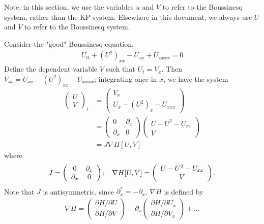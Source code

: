 \documentclass[12pt]{article}
\newcommand{\pd}[0]{\partial}
\numberwithin{equation}{section}
\begin{document}
Note: in this section, we use the variables $u$ and $V$ to refer to the Boussinesq system, rather than the KP system. Elsewhere in this document, we always use $U$ and $V$ to refer to the Boussinesq system.

Consider the "good" Boussinesq equation,
\begin{align}
    U_{tt} + \left(U^2\right)_{xx} - U_{xx} + U_{xxxx}= 0 \label{good boussinesq}
\end{align}
Define the dependent variable $V$ such that $U_t = V_x$. Then $V_{xt} = U_{xx}-\left(U^2\right)_{xx} - U_{xxxx}$; integrating once in $x$, we have the system
\begin{align}
    \left(\begin{array}{c}
         U  \\
         V 
    \end{array}\right)_t 
    &= 
    \left(\begin{array}{c}
         V_x  \\
         U_x - \left(U^2\right)_{x} - U_{xxx} 
    \end{array}\right)\nonumber \\
    &= 
    \left(\begin{array}{cc}
        0 & \pd_x \\
        \pd_x & 0
    \end{array}\right)
    \left(\begin{array}{c}
         U - U^2 - U_{xx}  \\
          V
    \end{array}\right) \nonumber\\
    &= J\nabla H[U,V] \label{JgradH}
\end{align}
where
\begin{align}
    J = \left(\begin{array}{cc}
        0 & \pd_x \\
        \pd_x & 0
    \end{array}\right); \hspace{3mm} \nabla H[U,V] =  \left(\begin{array}{c}
         U - U^2 - U_{xx}   \\
         V
    \end{array}\right). 
\end{align}
Note that $J$ is antisymmetric, since $\pd_x^* = -\pd_x$. $\nabla H$ is defined by
\begin{align}
\nabla H = 
     \left(\begin{array}{c}
         \pd H/\pd U  \\
         \pd H/\pd V 
    \end{array}\right)
    -
    \pd_x  \left(\begin{array}{c}
         \pd H/\pd U_x  \\
         \pd H/\pd V_x 
    \end{array}\right) + \ldots
\end{align}
\end{document}
